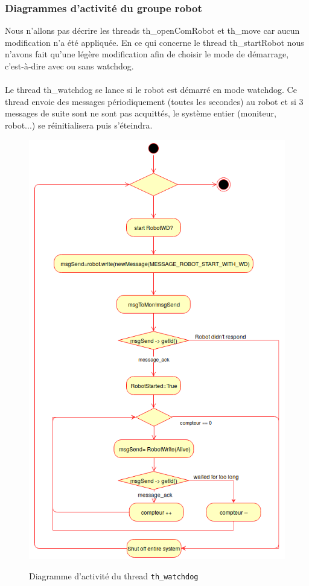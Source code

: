 \documentclass[11pt, a4paper]{paper}
\begin{document}
\subsubsection{Diagrammes d'activité du groupe robot}
{Nous n'allons pas décrire les threads th\_openComRobot et th\_move car aucun modification n'a été appliquée. En ce qui concerne le thread th\_startRobot nous n'avons fait qu'une légère modification afin de choisir le mode de démarrage, c'est-à-dire avec ou sans watchdog.}\\ \\

{Le thread th\_watchdog se lance si le robot est démarré en mode watchdog. Ce thread envoie des messages périodiquement (toutes les secondes) au robot et si 3 messages de suite sont ne sont pas acquittés, le système entier (moniteur, robot...) se réinitialisera puis s'éteindra.}

\begin{figure}[htbp]
\label{fig:act_envoyer}
\begin{center}
{\includegraphics[scale=.3]{./dossier_conception/th_watchdog}}
{\caption{Diagramme d'activité du thread {\tt th\_watchdog}}}
\end{center}
\end{figure}
\FloatBarrier
\end{document}
